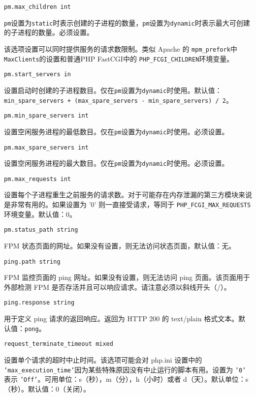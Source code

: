 \begin{compactenum}
\begin{compactitem}
\item \texttt{pm.max\_children int}

\texttt{pm}设置为\texttt{static}时表示创建的子进程的数量，\texttt{pm}设置为\texttt{dynamic}时表示最大可创建的子进程的数量。必须设置。

该选项设置可以同时提供服务的请求数限制。类似 Apache 的 \texttt{mpm\_prefork}中 \texttt{MaxClients}的设置和普通PHP FastCGI中的 \texttt{PHP\_FCGI\_CHILDREN}环境变量。

\item \texttt{pm.start\_servers in}

设置启动时创建的子进程数目。仅在\texttt{pm}设置为\texttt{dynamic}时使用。默认值：\texttt{min\_spare\_servers + (max\_spare\_servers - min\_spare\_servers) / 2}。

\item \texttt{pm.min\_spare\_servers int}

设置空闲服务进程的最低数目。仅在\texttt{pm}设置为\texttt{dynamic}时使用。必须设置。

\item \texttt{pm.max\_spare\_servers int}

设置空闲服务进程的最大数目。仅在\texttt{pm}设置为\texttt{dynamic}时使用。必须设置。

\item \texttt{pm.max\_requests int}

设置每个子进程重生之前服务的请求数。对于可能存在内存泄漏的第三方模块来说是非常有用的。如果设置为 '0' 则一直接受请求，等同于 \texttt{PHP\_FCGI\_MAX\_REQUESTS}环境变量。默认值：0。

\item \texttt{pm.status\_path string}

FPM 状态页面的网址。如果没有设置，则无法访问状态页面，默认值：无。

\item \texttt{ping.path string}

FPM 监控页面的 ping 网址。如果没有设置，则无法访问 ping 页面。该页面用于外部检测 FPM 是否存活并且可以响应请求。请注意必须以斜线开头（/）。

\item \texttt{ping.response string}

用于定义 ping 请求的返回响应。返回为 HTTP 200 的 text/plain 格式文本。默认值：\texttt{pong}。

\item \texttt{request\_terminate\_timeout mixed}

设置单个请求的超时中止时间。该选项可能会对 php.ini 设置中的 \texttt{'max\_execution\_time'}因为某些特殊原因没有中止运行的脚本有用。设置为 \texttt{'0'} 表示 \texttt{'Off'}。可用单位：s（秒），m（分），h（小时）或者 d（天）。默认单位：s（秒）。默认值：0（关闭）。


\end{compactitem}
\end{compactenum}
